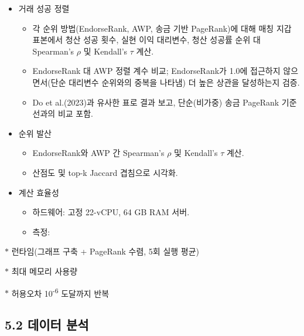 \begin{itemize}
\item[\textbullet] 거래 성공 정렬
\begin{itemize}
\item[\textendash] 각 순위 방법(EndorseRank, AWP, 송금 기반 PageRank)에 대해 매칭 지갑 표본에서 청산 성공 횟수, 실현 이익 대리변수, 청산 성공률 순위 대 Spearman's \emph{\(\rho\)} 및 Kendall's \emph{\(\tau\)} 계산.
\item[\textendash] EndorseRank 대 AWP 정렬 계수 비교; EndorseRank가 1.0에 접근하지 않으면서(단순 대리변수 순위와의 중복을 나타냄) 더 높은 상관을 달성하는지 검증.
\item[\textendash] Do et al.(2023)과 유사한 표로 결과 보고, 단순(비가중) 송금 PageRank 기준선과의 비교 포함.
\end{itemize}
\item[\textbullet] 순위 발산
\begin{itemize}
\item[\textendash] EndorseRank와 AWP 간 Spearman's \emph{\(\rho\)} 및 Kendall's \emph{\(\tau\)} 계산.
\item[\textendash] 산점도 및 top-k Jaccard 겹침으로 시각화.
\end{itemize}
\item[\textbullet] 계산 효율성
\begin{itemize}
\item[\textendash] 하드웨어: 고정 22-vCPU, 64 GB RAM 서버.
\item[\textendash] 측정:
\end{itemize}
\end{itemize}
\(\ast\) 런타임(그래프 구축 + PageRank 수렴, 5회 실행 평균)


\(\ast\) 최대 메모리 사용량


\(\ast\) 허용오차 10\textsuperscript{-}\textsuperscript{6} 도달까지 반복


\subsection*{5.2 데이터 분석}
\label{sec:data-analysis}


